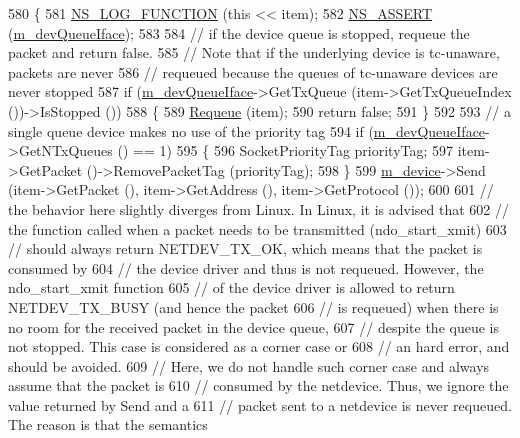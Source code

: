 \begin{DoxyCode}
580 \{
581   \hyperlink{log-macros-disabled_8h_a90b90d5bad1f39cb1b64923ea94c0761}{NS\_LOG\_FUNCTION} (\textcolor{keyword}{this} << item);
582   \hyperlink{assert_8h_a6dccdb0de9b252f60088ce281c49d052}{NS\_ASSERT} (\hyperlink{classns3_1_1QueueDisc_a265febf26e8325dbb3ba1f905ea1912d}{m\_devQueueIface});
583 
584   \textcolor{comment}{// if the device queue is stopped, requeue the packet and return false.}
585   \textcolor{comment}{// Note that if the underlying device is tc-unaware, packets are never}
586   \textcolor{comment}{// requeued because the queues of tc-unaware devices are never stopped}
587   \textcolor{keywordflow}{if} (\hyperlink{classns3_1_1QueueDisc_a265febf26e8325dbb3ba1f905ea1912d}{m\_devQueueIface}->GetTxQueue (item->GetTxQueueIndex ())->IsStopped ())
588     \{
589       \hyperlink{classns3_1_1QueueDisc_a45cd8fdd2469b9e9d7551af22cfdb1a2}{Requeue} (item);
590       \textcolor{keywordflow}{return} \textcolor{keyword}{false};
591     \}
592 
593   \textcolor{comment}{// a single queue device makes no use of the priority tag}
594   \textcolor{keywordflow}{if} (\hyperlink{classns3_1_1QueueDisc_a265febf26e8325dbb3ba1f905ea1912d}{m\_devQueueIface}->GetNTxQueues () == 1)
595     \{
596       SocketPriorityTag priorityTag;
597       item->GetPacket ()->RemovePacketTag (priorityTag);
598     \}
599   \hyperlink{classns3_1_1QueueDisc_ad9a47fe0eb33b8e1ef760966b1ad6b7c}{m\_device}->Send (item->GetPacket (), item->GetAddress (), item->GetProtocol ());
600 
601   \textcolor{comment}{// the behavior here slightly diverges from Linux. In Linux, it is advised that}
602   \textcolor{comment}{// the function called when a packet needs to be transmitted (ndo\_start\_xmit)}
603   \textcolor{comment}{// should always return NETDEV\_TX\_OK, which means that the packet is consumed by}
604   \textcolor{comment}{// the device driver and thus is not requeued. However, the ndo\_start\_xmit function}
605   \textcolor{comment}{// of the device driver is allowed to return NETDEV\_TX\_BUSY (and hence the packet}
606   \textcolor{comment}{// is requeued) when there is no room for the received packet in the device queue,}
607   \textcolor{comment}{// despite the queue is not stopped. This case is considered as a corner case or}
608   \textcolor{comment}{// an hard error, and should be avoided.}
609   \textcolor{comment}{// Here, we do not handle such corner case and always assume that the packet is}
610   \textcolor{comment}{// consumed by the netdevice. Thus, we ignore the value returned by Send and a}
611   \textcolor{comment}{// packet sent to a netdevice is never requeued. The reason is that the semantics}

\end{DoxyCode}
